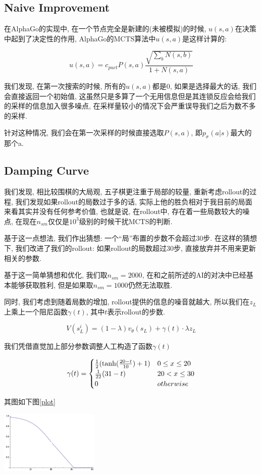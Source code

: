 \documentclass[twocolumn]{article}
\begin{document}
\subsection{Naive Improvement}

在AlphaGo的实现中, 在一个节点完全是新建的(未被模拟)的时候, $u(s, a)$在决策中起到了决定性的作用, AlphaGo的MCTS算法中$u(s, a)$是这样计算的:

\[
u(s, a) = c_{puct}P(s, a)\frac{\sqrt{\sum_{b}N(s,b)}}{1+N(s,a)}
\]

我们发现, 在第一次搜索的时候, 所有的$u(s, a)$都是$0$, 如果是选择最大的话, 我们会直接返回一个初始值, 这虽然只是多算了一个无用信息但是其连锁反应会给我们的采样的信息加入很多噪点, 在采样量较小的情况下会严重误导我们之后为数不多的采样.

针对这种情况, 我们会在第一次采样的时候直接选取$P(s, a)$, 即$p_\sigma(a|s)$最大的那个a.

\subsection{Damping Curve}

我们发现, 相比较围棋的大局观, 五子棋更注重于局部的较量, 重新考虑rollout的过程, 我们发现如果rollout的局数过于多的话, 实际上他的胜负相对于我目前的局面来看其实并没有任何参考价值, 也就是说, 在rollout中, 存在着一些局数较大的噪点, 在现在$n_{sm}$仅仅是$10^3$级别的时候干扰MCTS的判断. 

基于这一点想法, 我们作出猜想: 一个“局”布置的步数不会超过30步. 在这样的猜想下, 我们改进了我们的rollout: 如果rollout的局数超过30步, 直接放弃并不用来更新相关的参数.

基于这一简单猜想和优化, 我们取$n_{sm}=2000$, 在和之前所述的AI的对决中已经基本能够获取胜利, 但是如果取$n_{sm}=1000$仍然无法取胜.

同时, 我们考虑到随着局数的增加, rollout提供的信息的噪音就越大, 所以我们在$z_L$上乘上一个阻尼函数$\gamma(t)$, 其中$t$表示rollout的步数.

\[
V(s_L^i)=(1-\lambda)v_\theta(s_L) +  \gamma(t) \cdot \lambda z_L
\]

我们凭借直觉加上部分参数调整人工构造了函数$\gamma(t)$

\[
\gamma(t) = 
\begin{cases}
\frac{1}{2}(\tanh(\frac{20 - t}{10}) + 1) & 0 \le x \le 20 \cr
\frac{1}{22}(31-t) & 20 < x \le 30 \cr
0 & otherwise 
\end{cases}
\]

其图如下图\ref{plot}

\begin{center}
\makeatletter
\def\@captype{figure}
\makeatother
\includegraphics [height=3cm]{plot}
\caption{$\gamma(t)$}
\label{plot}
\end{center}
\end{document}
